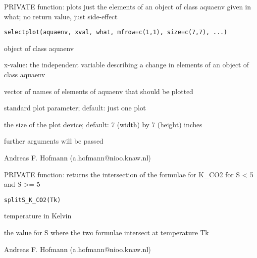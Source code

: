 \documentclass{article}
\begin{document}
\begin{Description}\relax
PRIVATE function: plots just the elements of an object of class aquaenv given in what; no return value, just side-effect
\end{Description}
\begin{Usage}
\begin{verbatim}selectplot(aquaenv, xval, what, mfrow=c(1,1), size=c(7,7), ...)\end{verbatim}
\end{Usage}
\begin{Arguments}
\begin{ldescription}
\item[\code{aquaenv }] object of class aquaenv
\item[\code{xval }] x-value: the independent variable describing a change in elements of an object of class aquaenv
\item[\code{what }] vector of names of elements of aquaenv that should be plotted
\item[\code{mfrow }] standard plot parameter; default: just one plot
\item[\code{size }] the size of the plot device; default: 7 (width) by 7 (height) inches
\item[\code{... }] further arguments will be passed
\end{ldescription}
\end{Arguments}
\begin{Author}\relax
Andreas F. Hofmann (a.hofmann@nioo.knaw.nl)
\end{Author}

\begin{Description}\relax
PRIVATE function: returns the intersection of the formulae for K\_CO2 for S < 5 and S >= 5
\end{Description}
\begin{Usage}
\begin{verbatim}splitS_K_CO2(Tk)\end{verbatim}
\end{Usage}
\begin{Arguments}
\begin{ldescription}
\item[\code{Tk }] temperature in Kelvin
\end{ldescription}
\end{Arguments}
\begin{Value}
the value for S where the two formulae intersect at temperature Tk
\end{Value}
\begin{Author}\relax
Andreas F. Hofmann (a.hofmann@nioo.knaw.nl)
\end{Author}
\end{document}
